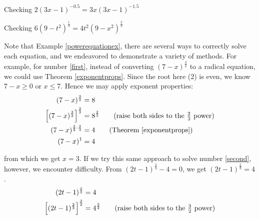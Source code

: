 \begin{ex}
\begin{enumerate}
\begin{mfigure}


\caption{Checking $2(3x-1)^{-0.5}  = 3x (3x-1)^{-1.5}$}
\label{fig:powereqex05}
\end{mfigure}

\begin{mfigure}
      

\caption{Checking  $6(9-t^2)^{\frac{1}{3}} = 4t^2 (9-x^2)^{\frac{2}{3}}$}
\label{fig:powereqex06}

\end{mfigure}

\end{enumerate}

\end{ex}

Note that Example \ref{powerequationex}, there are several ways to correctly solve each equation, and we endeavored to demonstrate a variety of methods.  For example, for number \ref{first}, instead of converting $(7-x)^{\frac{3}{2}}$ to a radical equation, we could use Theorem \ref{exponentprops}.  Since the root here ($2$) is even, we know $7-x \geq 0$ or $x \leq 7$.  Hence we may apply exponent properties: 
\begin{align*}
(7-x)^{\frac{3}{2}} & = 8 \\
 \left[(7-x)^{\frac{3}{2}}\right]^{\frac{2}{3}} & = 8^{\frac{2}{3}} \tag{raise both sides to the $\frac{2}{3}$ power} \\
 (7-x)^{\frac{3}{2} \cdot \frac{2}{3}} & = 4 \tag{Theorem \ref{exponentprops}} \\
(7-x)^{1} & = 4 \\
\end{align*}

from which we get $x = 3$.  If we try this same approach to solve number \ref{second}, however, we encounter difficulty.  From $(2t-1)^{\frac{2}{3}} -4 = 0$, we get $(2t-1)^{\frac{2}{3}}  =4$.  
\begin{align*}
(2t-1)^{\frac{2}{3}} & = 4 \\
 \left[(2t-1)^{\frac{2}{3}}  \right]^{\frac{3}{2}} & = 4^{\frac{3}{2}} \tag{raise both sides to the $\frac{3}{2}$ power} \\
\end{align*}
 
